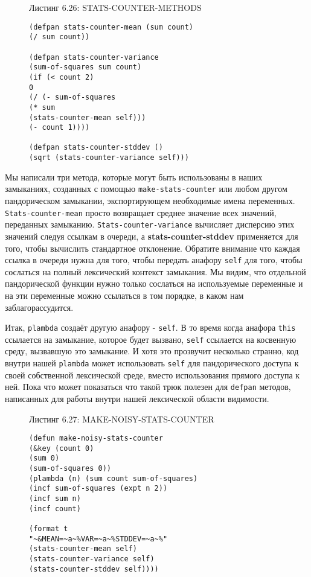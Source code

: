 \begin{figure}Листинг 6.26: STATS-COUNTER-METHODS\label{listing_6.26}
\listbegin
\begin{verbatim}
(defpan stats-counter-mean (sum count)
(/ sum count))

(defpan stats-counter-variance
(sum-of-squares sum count)
(if (< count 2)
0
(/ (- sum-of-squares
(* sum
(stats-counter-mean self)))
(- count 1))))

(defpan stats-counter-stddev ()
(sqrt (stats-counter-variance self)))
\end{verbatim}
\listend
\end{figure}

Мы написали три метода, которые могут быть использованы в наших замыканиях, созданных с помощью \verb"make-stats-counter" или любом другом пандорическом замыкании, экспортирующем необходимые имена переменных. \verb"Stats-counter-mean" просто возвращает среднее значение всех значений, переданных замыканию. \verb"Stats-counter-variance" вычисляет дисперсию этих значений следуя ссылкам в очереди, а {\Eng\textbf{stats-counter-stddev}} применяется для того, чтобы вычислить стандартное отклонение. Обратите внимание что каждая ссылка в очереди нужна для того, чтобы передать анафору \verb"self" для того, чтобы сослаться на полный лексический контекст замыкания. Мы видим, что отдельной пандорической функции нужно только сослаться на используемые переменные и на эти переменные можно ссылаться в том порядке, в каком нам заблагорассудится.

Итак, \verb"plambda" создаёт другую анафору - \verb"self". В то время когда анафора \verb"this" ссылается на замыкание, которое будет вызвано, \verb"self" ссылается на косвенную среду, вызвавшую это замыкание. И хотя это прозвучит несколько странно, код внутри нашей \verb"plambda" может использовать \verb"self" для пандорического доступа к своей собственной лексической среде, вместо использования прямого доступа к ней. Пока что может показаться что такой трюк полезен для \verb"defpan" методов, написанных для работы внутри нашей лексической области видимости.

\begin{figure}Листинг 6.27: MAKE-NOISY-STATS-COUNTER\label{listing_6.27}
\listbegin
\begin{verbatim}
(defun make-noisy-stats-counter
(&key (count 0)
(sum 0)
(sum-of-squares 0))
(plambda (n) (sum count sum-of-squares)
(incf sum-of-squares (expt n 2))
(incf sum n)
(incf count)

(format t
"~&MEAN=~a~%VAR=~a~%STDDEV=~a~%"
(stats-counter-mean self)
(stats-counter-variance self)
(stats-counter-stddev self))))
\end{verbatim}
\listend
\end{figure}

